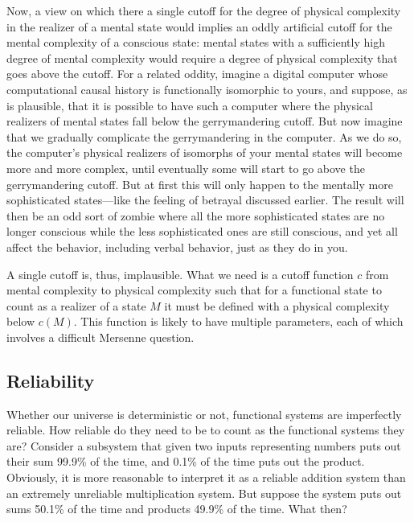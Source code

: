 Now, a view on which there a single cutoff for the degree of physical complexity in the realizer of a 
mental state would implies an oddly artificial cutoff for the mental complexity of a conscious state: 
mental states with a sufficiently high degree of mental complexity would require a degree of physical 
complexity that goes above the cutoff. For a related oddity, imagine a digital computer whose computational
causal history is functionally isomorphic to yours, and suppose, as is plausible, that it is possible to 
have such a computer where the physical realizers of mental states fall below the gerrymandering cutoff.
But now imagine that we gradually complicate the gerrymandering in the computer.
As we do so, the computer's physical realizers of isomorphs of your mental states will become more and more
complex, until eventually some will start to go above the gerrymandering cutoff. But at first this will only
happen to the mentally more sophisticated states---like the feeling of betrayal discussed earlier. The result will then be an odd sort of zombie where all the more sophisticated states are no longer conscious while the less sophisticated 
ones are still conscious, and yet all affect the behavior, including verbal behavior, just as they do in you.

A single cutoff is, thus, implausible. What we need is a cutoff function $c$ from mental complexity to physical
complexity such that for a functional state to count as a realizer of a state $M$ it must be defined with a 
physical complexity below $c(M)$. This function is likely to have multiple parameters, each of which involves
a difficult Mersenne question. 

\subsection{Reliability}
Whether our universe is deterministic or not, functional systems are imperfectly reliable.
How reliable do they need to be to count as the functional systems they are? Consider a subsystem that given two inputs representing numbers
puts out their sum 99.9\% of the time, and 0.1\% of the time puts out the product. Obviously, it is more reasonable to interpret it as 
a reliable addition system than an extremely unreliable multiplication system. But suppose the system puts out sums 50.1\% of the time
and products 49.9\% of the time. What then? 

